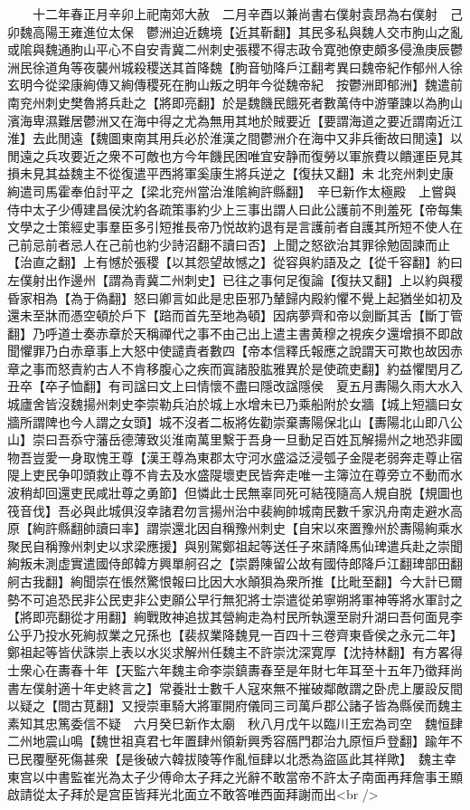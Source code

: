 　　十二年春正月辛卯上祀南郊大赦　二月辛酉以兼尚書右僕射袁昂為右僕射　己卯魏高陽王雍進位太保　鬱洲迫近魏境【近其靳翻】其民多私與魏人交市朐山之亂或隂與魏通朐山平心不自安青冀二州刺史張稷不得志政令寛弛僚吏頗多侵漁庚辰鬱洲民徐道角等夜襲州城殺稷送其首降魏【胊音劬降戶江翻考異曰魏帝紀作郁州人徐玄明今從梁康絢傳又絢傳稷死在朐山叛之明年今從魏帝紀　按鬱洲即郁洲】魏遣前南兖州刺史樊魯將兵赴之【將即亮翻】於是魏饑民餓死者數萬侍中游肇諫以為朐山濱海卑濕難居鬱洲又在海中得之尤為無用其地於賊要近【要謂海道之要近謂南近江淮】去此閒遠【魏圖東南其用兵必於淮漢之間鬱洲介在海中又非兵衝故曰閒遠】以閒遠之兵攻要近之衆不可敵也方今年饑民困唯宜安静而復勞以軍旅費以饋運臣見其損未見其益魏主不從復遣平西將軍奚康生將兵逆之【復扶又翻】未北兖州刺史康絢遣司馬霍奉伯討平之【梁北兖州當治淮隂絢許縣翻】　辛巳新作太極殿　上嘗與侍中太子少傅建昌侯沈約各疏策事約少上三事出謂人曰此公護前不則羞死【帝每集文學之士策經史事羣臣多引短推長帝乃悦故約退有是言護前者自護其所短不使人在己前忌前者忌人在己前也約少詩沼翻不讀曰否】上聞之怒欲治其罪徐勉固諫而止【治直之翻】上有憾於張稷【以其怨望故憾之】從容與約語及之【從千容翻】約曰左僕射出作邊州【謂為青冀二州刺史】已往之事何足復論【復扶又翻】上以約與稷昏家相為【為于偽翻】怒曰卿言如此是忠臣邪乃輦歸内殿約懼不覺上起猶坐如初及還未至牀而憑空頓於戶下【踣而首先至地為頓】因病夢齊和帝以劍斷其舌【斷丁管翻】乃呼道士奏赤章於天稱禪代之事不由己出上遣主書黄穆之視疾夕還增損不即啟聞懼罪乃白赤章事上大怒中使譴責者數四【帝本信釋氏報應之說謂天可欺也故因赤章之事而怒責約古人不肯移腹心之疾而寘諸股肱雅異於是使疏吏翻】約益懼閏月乙丑卒【卒子恤翻】有司諡曰文上曰情懷不盡曰隱改諡隱侯　夏五月夀陽久雨大水入城廬舍皆沒魏揚州刺史李崇勒兵泊於城上水增未已乃乘船附於女牆【城上短牆曰女牆所謂陴也今人謂之女頭】城不沒者二板將佐勸崇棄夀陽保北山【夀陽北山即八公山】崇曰吾忝守藩岳德薄致災淮南萬里繫于吾身一旦動足百姓瓦解揚州之地恐非國物吾豈愛一身取愧王尊【漢王尊為東郡太守河水盛溢泛浸瓠子金隄老弱奔走尊止宿隄上吏民争叩頭救止尊不肯去及水盛隄壞吏民皆奔走唯一主簿泣在尊旁立不動而水波稍却回還吏民咸壯尊之勇節】但憐此士民無辜同死可結筏隨高人規自脱【規圖也筏音伐】吾必與此城俱沒幸諸君勿言揚州治中裴絢帥城南民數千家汎舟南走避水高原【絢許縣翻帥讀曰率】謂崇還北因自稱豫州刺史【自宋以來置豫州於夀陽絢乘水聚民自稱豫州刺史以求梁應援】與别駕鄭祖起等送任子來請降馬仙琕遣兵赴之崇聞絢叛未測虚實遣國侍郎韓方興單舸召之【崇爵陳留公故有國侍郎降戶江翻琕部田翻舸古我翻】絢聞崇在悵然驚恨報曰比因大水顛狽為衆所推【比毗至翻】今大計已爾勢不可追恐民非公民吏非公吏願公早行無犯將士崇遣從弟寧朔將軍神等將水軍討之【將即亮翻從才用翻】絢戰敗神追拔其營絢走為村民所執還至尉升湖曰吾何面見李公乎乃投水死絢叔業之兄孫也【裴叔業降魏見一百四十三卷齊東昏侯之永元二年】鄭祖起等皆伏誅崇上表以水災求解州任魏主不許崇沈深寛厚【沈持林翻】有方畧得士衆心在夀春十年【天監六年魏主命李崇鎮夀春至是年財七年耳至十五年乃徵拜尚書左僕射適十年史終言之】常養壯士數千人寇來無不摧破鄰敵謂之卧虎上屢設反間以疑之【間古莧翻】又授崇車騎大將軍開府儀同三司萬戶郡公諸子皆為縣侯而魏主素知其忠篤委信不疑　六月癸巳新作太廟　秋八月戊午以臨川王宏為司空　魏恒肆二州地震山鳴【魏世祖真君七年置肆州領新興秀容鴈門郡治九原恒戶登翻】踰年不已民覆壓死傷甚衆【是後破六韓拔陵等作亂恒肆以北悉為盜區此其祥歟】　魏主幸東宫以中書監崔光為太子少傅命太子拜之光辭不敢當帝不許太子南面再拜詹事王顯啟請從太子拜於是宫臣皆拜光北面立不敢答唯西面拜謝而出<br />
